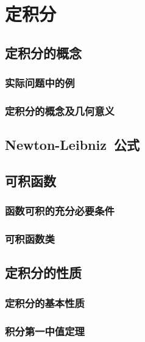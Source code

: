 

\chapter{定积分}\label{ch:7}
\section{定积分的概念}
\subsection{实际问题中的例}
\subsection{定积分的概念及几何意义}
\begin{exercise}

\end{exercise}
\section{Newton-Leibniz~公式}
\begin{exercise}

\end{exercise}
\section{可积函数}
\subsection{函数可积的充分必要条件}
\subsection{可积函数类}
\begin{exercise}

\end{exercise}
\section{定积分的性质}
\subsection{定积分的基本性质}
\subsection{积分第一中值定理}
\begin{exercise}

\end{exercise}
